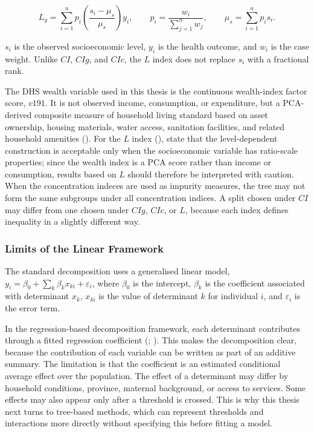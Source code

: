 \documentclass[
  11pt,
  a4paper,
]{article}
\begin{document}
\[
L_y =
\sum_{i=1}^{n} p_i
\left(\frac{s_i-\mu_s}{\mu_s}\right)y_i,
\qquad
p_i = \frac{w_i}{\sum_{j=1}^{n} w_j},
\qquad
\mu_s = \sum_{i=1}^{n} p_i s_i.
\]

\(s_i\) is the observed socioeconomic level, \(y_i\) is the health
outcome, and \(w_i\) is the case weight. Unlike \(CI\), \(CIg\), and
\(CIc\), the \(L\) index does not replace \(s_i\) with a fractional
rank.

The DHS wealth variable used in this thesis is the continuous
wealth-index factor score, \(v191\). It is not observed income,
consumption, or expenditure, but a PCA-derived composite measure of
household living standard based on asset ownership, housing materials,
water access, sanitation facilities, and related household amenities
(). For the \(L\) index
(), state that the level-dependent construction is acceptable only
when the socioeconomic variable has ratio-scale properties; since the
wealth index is a PCA score rather than income or consumption, results
based on \(L\) should therefore be interpreted with caution. When the
concentration indeces are used as impurity measures, the tree may not
form the same subgroups under all concentration indices. A split chosen
under \(CI\) may differ from one chosen under \(CIg\), \(CIc\), or
\(L\), because each index defines inequality in a slightly different
way.

\subsubsection{Limits of the Linear
Framework}\label{sec-linear-framework-limits}

The standard decomposition uses a generalised linear model,
\(y_i = \beta_0 + \sum_k \beta_k x_{ki} + \varepsilon_i\), where
\(\beta_0\) is the intercept, \(\beta_k\) is the coefficient associated
with determinant \(x_k\), \(x_{ki}\) is the value of determinant \(k\)
for individual \(i\), and \(\varepsilon_i\) is the error term.

In the regression-based decomposition framework, each determinant
contributes through a fitted regression coefficient
(; ). This makes the decomposition clear, because the
contribution of each variable can be written as part of an additive
summary. The limitation is that the coefficient is an estimated
conditional average effect over the population. The effect of a
determinant may differ by household conditions, province, maternal
background, or access to services. Some effects may also appear only
after a threshold is crossed. This is why this thesis next turns to
tree-based methods, which can represent thresholds and interactions more
directly without specifying this before fitting a model.
\end{document}
